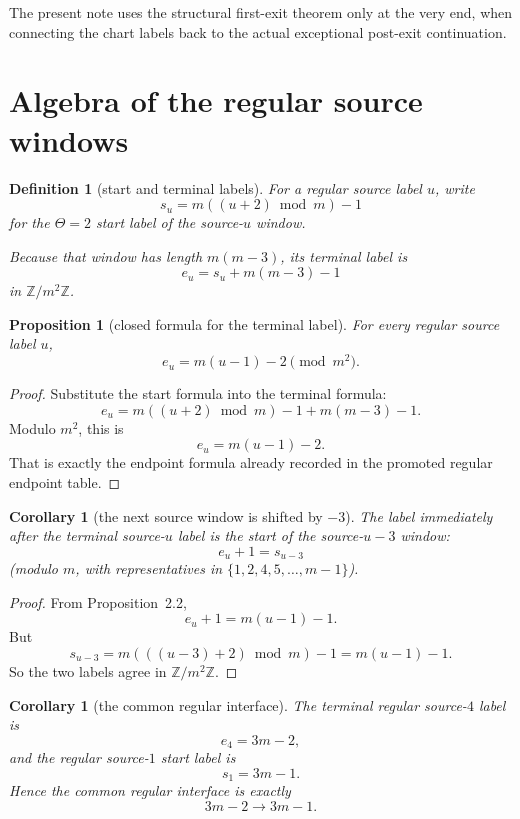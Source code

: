 \documentclass[11pt]{article}
\newtheorem{proposition}[theorem]{Proposition}
\newtheorem{corollary}[theorem]{Corollary}
\newtheorem{definition}[theorem]{Definition}
\newcommand{\Z}{\mathbb Z}
\begin{document}
The present note uses the structural first-exit theorem only at the very end,
when connecting the chart labels back to the actual exceptional post-exit
continuation.

\section{Algebra of the regular source windows}

\begin{definition}[start and terminal labels]
For a regular source label $u$, write
\[
s_u = m((u+2) \bmod m)-1
\]
for the $\Theta=2$ start label of the source-$u$ window.

Because that window has length $m(m-3)$, its terminal label is
\[
e_u = s_u + m(m-3)-1
\]
in $\Z/m^2\Z$.
\end{definition}

\begin{proposition}[closed formula for the terminal label]
For every regular source label $u$,
\[
e_u = m(u-1)-2 \pmod{m^2}.
\]
\end{proposition}

\begin{proof}
Substitute the start formula into the terminal formula:
\[
e_u = m((u+2) \bmod m)-1 + m(m-3)-1.
\]
Modulo $m^2$, this is
\[
e_u = m(u-1)-2.
\]
That is exactly the endpoint formula already recorded in the promoted regular
endpoint table.
\end{proof}

\begin{corollary}[the next source window is shifted by $-3$]
The label immediately after the terminal source-$u$ label is the start of the
source-$u-3$ window:
\[
e_u + 1 = s_{u-3}
\]
(modulo $m$, with representatives in $\{1,2,4,5,\dots,m-1\}$).
\end{corollary}

\begin{proof}
From Proposition~2.2,
\[
e_u + 1 = m(u-1)-1.
\]
But
\[
s_{u-3} = m(((u-3)+2) \bmod m)-1 = m(u-1)-1.
\]
So the two labels agree in $\Z/m^2\Z$.
\end{proof}

\begin{corollary}[the common regular interface]
The terminal regular source-$4$ label is
\[
e_4 = 3m-2,
\]
and the regular source-$1$ start label is
\[
s_1 = 3m-1.
\]
Hence the common regular interface is exactly
\[
3m-2 \to 3m-1.
\]
\end{corollary}
\end{document}

